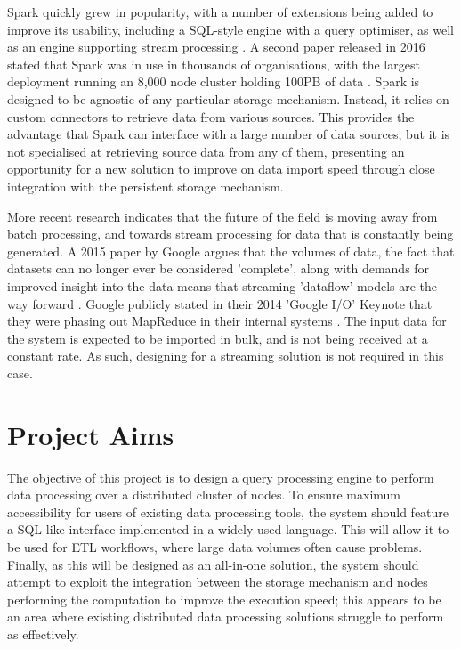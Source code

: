Spark quickly grew in popularity, with a number of extensions being added to improve its usability, including a SQL-style engine with a query optimiser, as well as an engine supporting stream processing \cite{armbrust2015sparksql, armbrust2018sparkstreaming}. A second paper released in 2016 stated that Spark was in use in thousands of organisations, with the largest deployment running an 8,000 node cluster holding 100PB of data \cite{zaharia2016spark}. Spark is designed to be agnostic of any particular storage mechanism. Instead, it relies on custom connectors to retrieve data from various sources. This provides the advantage that Spark can interface with a large number of data sources, but it is not specialised at retrieving source data from any of them, presenting an opportunity for a new solution to improve on data import speed through close integration with the persistent storage mechanism.

More recent research indicates that the future of the field is moving away from batch processing, and towards stream processing for data that is constantly being generated. A 2015 paper by Google argues that the volumes of data, the fact that datasets can no longer ever be considered 'complete', along with demands for improved insight into the data means that streaming 'dataflow' models are the way forward  \cite{akidau2015dataflow}. Google publicly stated in their 2014 'Google I/O' Keynote that they were phasing out MapReduce in their internal systems \cite{googleio2014}. The input data for the system is expected to be imported in bulk, and is not being received at a constant rate. As such, designing for a streaming solution is not required in this case.

\section{Project Aims}
The objective of this project is to design a query processing engine to perform data processing over a distributed cluster of nodes. To ensure maximum accessibility for users of existing data processing tools, the system should feature a SQL-like interface implemented in a widely-used language. This will allow it to be used for ETL workflows, where large data volumes often cause problems. Finally, as this will be designed as an all-in-one solution, the system should attempt to exploit the integration between the storage mechanism and nodes performing the computation to improve the execution speed; this appears to be an area where existing distributed data processing solutions struggle to perform as effectively.


